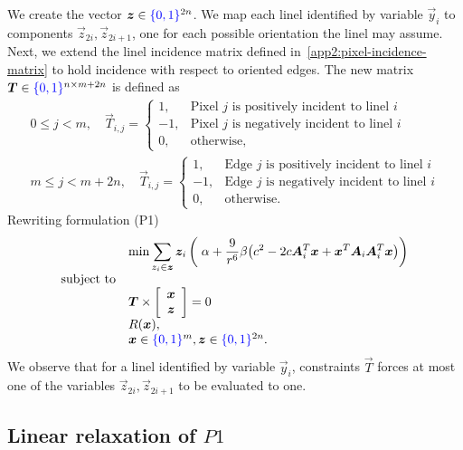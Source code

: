 We create the vector $\bm{z} \in {\color{blue}{\{0,1\}}}^{2n}$. We map each linel identified by variable $\vec{y}_i$ to components $\vec{z}_{2i},\vec{z}_{2i+1}$, one for each possible orientation the linel may assume. Next, we extend the linel incidence matrix defined in~\cref{app2:pixel-incidence-matrix} to hold incidence with respect to oriented edges. The new matrix $\bm{T} \in {\color{blue}{\{0,1\}}}^{n \times m + 2n}$ is defined as
\begin{align*}
	0 \leq j < m, \quad \vec{T}_{i,j} = \left\{ \begin{array}{ll}
	1,& \text{Pixel $j$ is positively incident to linel $i$}\\
	-1,& \text{Pixel $j$ is negatively incident to linel $i$}\\	
	0,& \text{otherwise},
	\end{array}\right.\\[1em]
	m \leq j < m + 2n, \quad \vec{T}_{i,j} = \left\{ \begin{array}{ll}
	1,& \text{Edge $j$ is positively incident to linel $i$}\\
	-1,& \text{Edge $j$ is negatively incident to linel $i$}\\	
	0,& \text{otherwise}.
	\end{array}\right.
\end{align*}
%
Rewriting formulation (P1)
%
\begin{align*}
\begin{array}{ll}
& \displaystyle	\min \sum_{z_i \in \bm{z}}{ \bm{z}_i \left(\; \alpha + \frac{9}{r^6}\beta \big(c^2 - 2c\bm{A}_i^T\bm{x} + \bm{x}^T\bm{A}_i\bm{A}_i^T\bm{x}\big)\right)} \\
\text{subject to}\\
&	\bm{T} \times  \left[ \begin{array}{c}
							\bm{x} \\ 
							\bm{z} 
						   \end{array} \right] = 0 \\
&   R(\bm{x}),\\
&   \bm{x} \in {\color{blue}{\{0,1\}}}^{m}, \bm{z} \in {\color{blue}{\{0,1\}}}^{2n}.
\end{array}
\end{align*}
%
%
We observe that for a linel identified by variable $\vec{y}_i$, constraints $\vec{T}$ forces at most one of the variables $\vec{z}_{2i},\vec{z}_{2i+1}$ to be evaluated to one. 


\subsection{Linear relaxation of $P1$}
\label{ch5:subsec:linear-relaxation}

